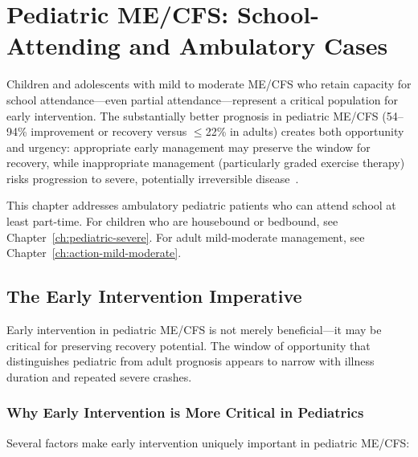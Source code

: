 \chapter{Pediatric ME/CFS: School-Attending and Ambulatory Cases}
\label{ch:pediatric-ambulatory}

Children and adolescents with mild to moderate ME/CFS who retain capacity for school attendance---even partial attendance---represent a critical population for early intervention. The substantially better prognosis in pediatric ME/CFS (54--94\% improvement or recovery versus $\leq$22\% in adults) creates both opportunity and urgency: appropriate early management may preserve the window for recovery, while inappropriate management (particularly graded exercise therapy) risks progression to severe, potentially irreversible disease~\cite{Rowe2017pediatric, CDC2024pediatric}.

This chapter addresses ambulatory pediatric patients who can attend school at least part-time. For children who are housebound or bedbound, see Chapter~\ref{ch:pediatric-severe}. For adult mild-moderate management, see Chapter~\ref{ch:action-mild-moderate}.

\section{The Early Intervention Imperative}
\label{sec:ped-early-intervention}

Early intervention in pediatric ME/CFS is not merely beneficial---it may be critical for preserving recovery potential. The window of opportunity that distinguishes pediatric from adult prognosis appears to narrow with illness duration and repeated severe crashes.

\subsection{Why Early Intervention is More Critical in Pediatrics}

Several factors make early intervention uniquely important in pediatric ME/CFS:

